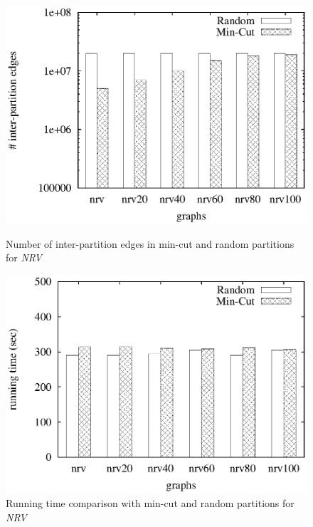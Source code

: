 \begin{figure}[htbp]
\hfill
\begin{minipage}[t]{0.45\linewidth}
\begin{center}
\centerline{\includegraphics[scale=0.35]{plots/enhanced-sahad-inter-part-nrv.eps}}
\caption{Number of inter-partition edges in min-cut and random partitions for \textit{NRV}}
\label{fig:nrv-random-min-cut-edges}
\end{center}
\end{minipage}
\hfill
\begin{minipage}[t]{0.45\linewidth}
\begin{center}
\centerline{\includegraphics[scale=0.35]{plots/enhanced-sahad-inter-part-nrv-time.eps}}
\caption{Running time comparison with min-cut and random partitions for
\textit{NRV}}
\label{fig:nrv-random-min-cut-time}
\end{center}
\end{minipage}
\hfill
\end{figure}


